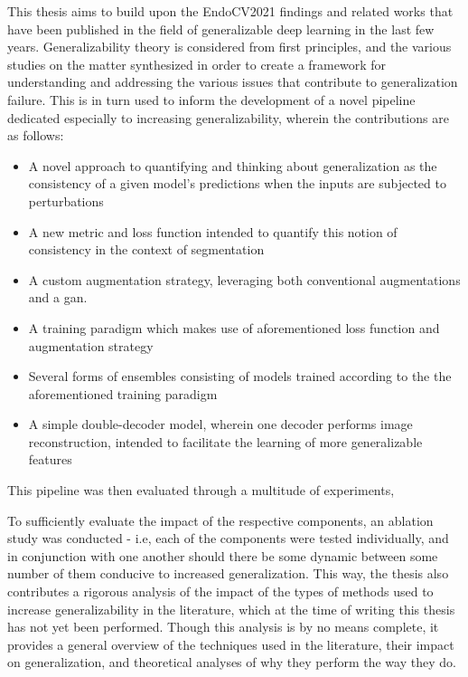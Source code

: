     This thesis aims to build upon the EndoCV2021 findings and related works that have been published in the field of generalizable deep learning in the last few years. Generalizability theory is considered from first principles, and the various studies on the matter synthesized in order to create a framework for understanding and addressing the various issues that contribute to generalization failure. This is in turn used to inform the development of a novel pipeline dedicated especially to increasing generalizability, wherein the contributions are as follows:
    \begin{itemize}
        \item A novel approach to quantifying and thinking about generalization as the consistency of a given model's predictions when the inputs are subjected to perturbations 
        \item A new metric and loss function intended to quantify this notion of consistency in the context of segmentation
        \item A custom augmentation strategy, leveraging both conventional augmentations and a \gls{gan}.
        \item A training paradigm which makes use of aforementioned loss function and augmentation strategy
        \item Several forms of ensembles consisting of models trained according to the the aforementioned training paradigm
        \item A simple double-decoder model, wherein one decoder performs image reconstruction, intended to facilitate the learning of more generalizable features
    \end{itemize}
    
    This pipeline was then evaluated through a multitude of experiments,
    

    To sufficiently evaluate the impact of the respective components, an ablation study was conducted - i.e, each of the components were tested individually, and in conjunction with one another should there be some dynamic between some number of them conducive to increased generalization. This way, the thesis also contributes a rigorous analysis of the impact of the types of methods used to increase generalizability in the literature, which at the time of writing this thesis has not yet been performed. Though this analysis is by no means complete, it provides a general overview of the techniques used in the literature, their impact on generalization, and theoretical analyses of why they perform the way they do.
    
